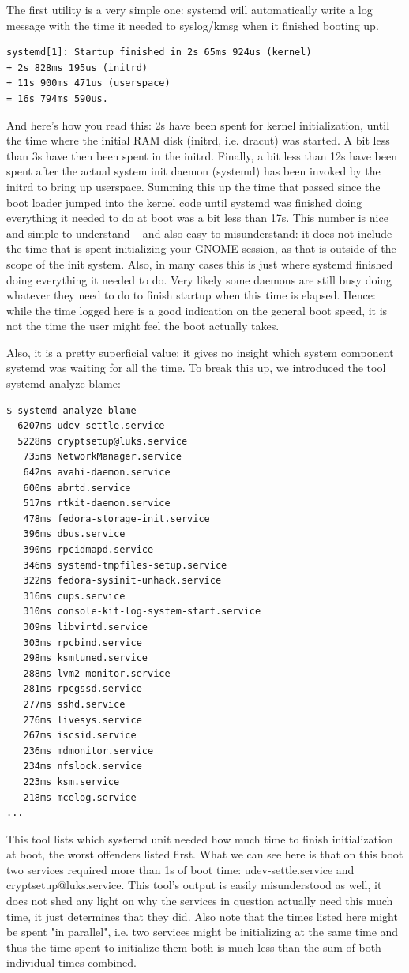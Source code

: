 \documentclass[titlepage]{article}
\begin{document}
The first utility is a very simple one: systemd will automatically write a log message with the time it needed to syslog/kmsg when it finished booting up.
\begin{lstlisting}
systemd[1]: Startup finished in 2s 65ms 924us (kernel) 
+ 2s 828ms 195us (initrd) 
+ 11s 900ms 471us (userspace) 
= 16s 794ms 590us.
\end{lstlisting}
And here's how you read this: 2s have been spent for kernel initialization, until the time where the initial RAM disk (initrd, i.e. dracut) was started. A bit less than 3s have then been spent in the initrd. Finally, a bit less than 12s have been spent after the actual system init daemon (systemd) has been invoked by the initrd to bring up userspace. Summing this up the time that passed since the boot loader jumped into the kernel code until systemd was finished doing everything it needed to do at boot was a bit less than 17s. This number is nice and simple to understand -- and also easy to misunderstand: it does not include the time that is spent initializing your GNOME session, as that is outside of the scope of the init system. Also, in many cases this is just where systemd finished doing everything it needed to do. Very likely some daemons are still busy doing whatever they need to do to finish startup when this time is elapsed. Hence: while the time logged here is a good indication on the general boot speed, it is not the time the user might feel the boot actually takes.

Also, it is a pretty superficial value: it gives no insight which system component systemd was waiting for all the time. To break this up, we introduced the tool systemd-analyze blame:
\begin{lstlisting}
$ systemd-analyze blame
  6207ms udev-settle.service
  5228ms cryptsetup@luks.service
   735ms NetworkManager.service
   642ms avahi-daemon.service
   600ms abrtd.service
   517ms rtkit-daemon.service
   478ms fedora-storage-init.service
   396ms dbus.service
   390ms rpcidmapd.service
   346ms systemd-tmpfiles-setup.service
   322ms fedora-sysinit-unhack.service
   316ms cups.service
   310ms console-kit-log-system-start.service
   309ms libvirtd.service
   303ms rpcbind.service
   298ms ksmtuned.service
   288ms lvm2-monitor.service
   281ms rpcgssd.service
   277ms sshd.service
   276ms livesys.service
   267ms iscsid.service
   236ms mdmonitor.service
   234ms nfslock.service
   223ms ksm.service
   218ms mcelog.service
...
\end{lstlisting}
This tool lists which systemd unit needed how much time to finish initialization at boot, the worst offenders listed first. What we can see here is that on this boot two services required more than 1s of boot time: udev-settle.service and cryptsetup@luks.service. This tool's output is easily misunderstood as well, it does not shed any light on why the services in question actually need this much time, it just determines that they did. Also note that the times listed here might be spent "in parallel", i.e. two services might be initializing at the same time and thus the time spent to initialize them both is much less than the sum of both individual times combined.
\end{document}
